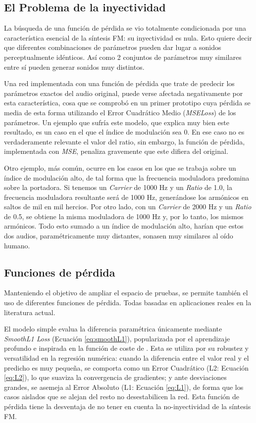 \subsection{El Problema de la inyectividad}
La búsqueda de una función de pérdida se vio totalmente condicionada por una característica esencial de la síntesis FM: su inyectividad es nula. Esto quiere decir que diferentes combinaciones de parámetros pueden dar lugar a sonidos perceptualmente idénticos. Así como 2 conjuntos de parámetros muy similares entre sí pueden generar sonidos muy distintos.

Una red implementada con una función de pérdida que trate de predecir los parámetros exactos del audio original, puede verse afectada negativamente por esta característica, cosa que se comprobó en un primer prototipo cuya pérdida se media de esta forma utilizando el Error Cuadrático Medio (\textit{MSELoss}) de los parámetros. Un ejemplo que sufría este modelo, que explica muy bien este resultado, es un caso en el que el índice de modulación sea 0. En ese caso no es verdaderamente relevante el valor del ratio, sin embargo, 
la función de pérdida, implementada con \textit{MSE}, penaliza gravemente que este difiera del original. 

Otro ejemplo, más común, ocurre en los casos en los que se trabaja sobre un índice de modulación alto, de tal forma que la frecuencia moduladora predomina sobre la portadora. Si tenemos un \textit{Carrier} de 1000 Hz y un \textit{Ratio} de 1.0, la frecuencia moduladora resultante será de 1000 Hz, generándose los armónicos en saltos de mil en mil hercios. Por otro lado, con un \textit{Carrier} de 2000 Hz y un \textit{Ratio} de 0.5, se obtiene la misma moduladora de 1000 Hz y, por lo tanto, los mismos armónicos. Todo esto sumado a un índice de modulación alto, harían que estos dos audios, paramétricamente muy distantes, sonasen muy similares al oído humano. 

\subsection{Funciones de pérdida}

Manteniendo el objetivo de ampliar el espacio de pruebas, se permite también el uso de diferentes funciones de pérdida. Todas basadas en aplicaciones reales en la literatura actual.

El modelo simple evalua la diferencia paramétrica únicamente mediante
\textit{SmoothL1 Loss} (Ecuación \ref{eq:smoothL1}), popularizada por el aprendizaje profundo \citep{girshick2015fast} e inspirada en la función de coste de \cite{huber1964robust}. Esta se utiliza por su robustez y versatilidad en la regresión numérica: cuando la diferencia 
entre el valor real y el predicho es muy pequeña, se comporta como un Error Cuadrático (L2: Ecuación \ref{eq:L2}), lo que suaviza la convergencia
de gradientes; y ante desviaciones grandes, se asemeja al Error Absoluto (L1: Ecuación \ref{eq:L1}), de forma que los casos aislados que se alejan del resto 
no desestabilicen la red. Esta función de pérdida tiene la desventaja de no tener en cuenta la no-inyectividad de la síntesis FM.

